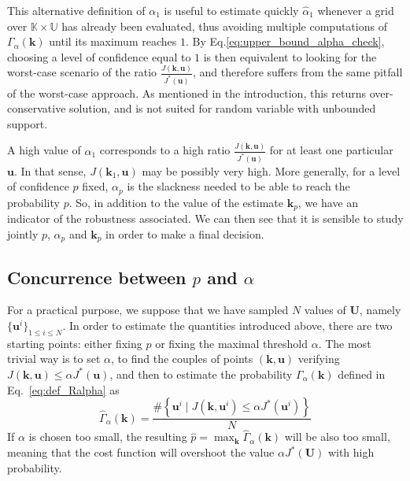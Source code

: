 \documentclass[preprint, 1p]{elsarticle}
\newcommand{\checkap}{{\alpha}_p}
\newcommand{\checka}{{\alpha}}
\newcommand{\checkk}{\mathbf{k}}
\newcommand{\checkkp}{{\mathbf{k}}_p}
\begin{document}
This alternative definition of $\checka_1$ is useful to estimate quickly $\hat{\checka}_1$ whenever a grid over $\mathbb{K}\times\mathbb{U}$ has already been evaluated, thus avoiding multiple computations of $\Gamma_{\alpha}(\mathbf{k})$ until its maximum reaches $1$. By Eq.\eqref{eq:upper_bound_alpha_check}, choosing a level of confidence equal to $1$ is then equivalent to looking for the worst-case scenario of the ratio $\frac{J(\mathbf{k},\mathbf{u})}{J^*(\mathbf{u})}$, and therefore suffers from the same pitfall of the worst-case approach. As mentioned in the introduction, this returns over-conservative solution, and is not suited for random variable with unbounded support.


A high value of $\checka_1$ corresponds to a high ratio $\frac{J(\mathbf{k},\mathbf{u})}{J^*(\mathbf{u})}$ for at least one particular $\mathbf{u}$. In that sense, $J(\checkk_1,\mathbf{u})$ may be possibly very high.
More generally, for a level of confidence $p$ fixed, $\checkap$ is the slackness needed to be able to reach the probability $p$. So, in addition to the value of the estimate $\checkkp$, we have an indicator of the robustness associated. We can then see that it is sensible to study jointly $p$, $\checkap$ and $\checkkp$ in order to make a final decision.


\subsection{Concurrence between $p$ and $\alpha$}%
\label{ssec:balance}
For a practical purpose, we suppose that we have sampled $N$ values of $\mathbf{U}$, namely $\{\mathbf{u}^i\}_{1\leq i \leq N}$.
In order to estimate the quantities introduced above, there are two starting points: either fixing $p$ or fixing the maximal threshold $\alpha$. 
The most trivial way is to set $\alpha$, to find the couples of points $(\mathbf{k},\mathbf{u})$ verifying $J(\mathbf{k},\mathbf{u}) \leq \alpha J^*(\mathbf{u})$, and then to estimate the probability $\Gamma_{\alpha}(\mathbf{k})$ defined in Eq.~\eqref{eq:def_Ralpha} as 
\begin{equation}
\hat{\Gamma}_{\alpha}(\mathbf{k}) = \frac{\# \left\{\mathbf{u}^i \mid J(\mathbf{k},\mathbf{u}^i) \leq \alpha J^*(\mathbf{u}^i)\right\}}{N}
\end{equation}
If $\alpha$ is chosen too small, the resulting $\hat{p}=\max_{\mathbf{k}} \hat{\Gamma}_{\alpha}(\mathbf{k})$ will be also too small, meaning that the cost function will overshoot the value $\alpha J^*(\mathbf{U})$ with high probability.
\end{document}
